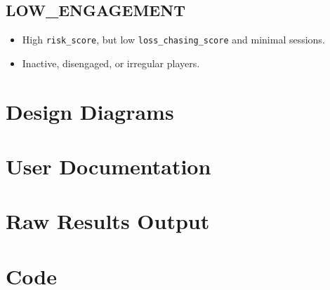 \documentclass[12pt,a4paper]{report}
\begin{document}
\section*{LOW\_ENGAGEMENT}
\begin{itemize}
    \item High \texttt{risk\_score}, but low \texttt{loss\_chasing\_score} and minimal sessions.
    \item Inactive, disengaged, or irregular players.
\end{itemize}




\chapter{Design Diagrams}

\chapter{User Documentation}

\chapter{Raw Results Output}




\chapter{Code}





%

\end{document}
